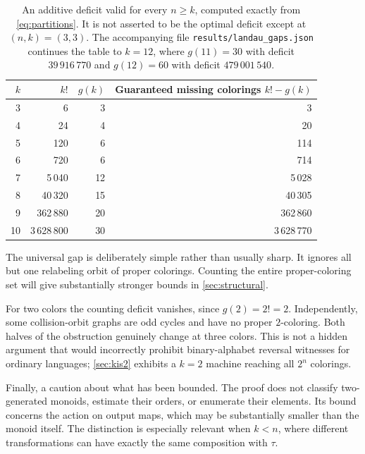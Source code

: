\documentclass[11pt,a4paper]{article}
\numberwithin{equation}{section}
\theoremstyle{definition}
\theoremstyle{remark}
\begin{document}
\begin{table}[htbp]
\centering
\begin{tabular}{@{}rrrr@{}}
\toprule
$k$ & $k!$ & $g(k)$ & Guaranteed missing colorings $k!-g(k)$\\
\midrule
3 & 6 & 3 & 3\\
4 & 24 & 4 & 20\\
5 & 120 & 6 & 114\\
6 & 720 & 6 & 714\\
7 & 5\,040 & 12 & 5\,028\\
8 & 40\,320 & 15 & 40\,305\\
9 & 362\,880 & 20 & 362\,860\\
10 & 3\,628\,800 & 30 & 3\,628\,770\\
\bottomrule
\end{tabular}
\caption{An additive deficit valid for every $n\ge k$, computed exactly from
\eqref{eq:partitions}. It is not asserted to be the optimal deficit except
at $(n,k)=(3,3)$. The accompanying file
\texttt{results/landau\_gaps.json} continues the table to $k=12$, where
$g(11)=30$ with deficit $39\,916\,770$ and $g(12)=60$ with deficit
$479\,001\,540$.}
\label{tab:landau}
\end{table}

The universal gap is deliberately simple rather than usually sharp. It
ignores all but one relabeling orbit of proper colorings. Counting the entire
proper-coloring set will give substantially stronger bounds in
\cref{sec:structural}.

\begin{remark}\label{rem:whythree}
For two colors the counting deficit vanishes, since $g(2)=2!=2$. Independently,
some collision-orbit graphs are odd cycles and have no proper $2$-coloring.
Both halves of the obstruction genuinely change at three colors. This is not
a hidden argument that would incorrectly prohibit binary-alphabet reversal
witnesses for ordinary languages; \cref{sec:kis2} exhibits a $k=2$ machine
reaching all $2^n$ colorings.
\end{remark}

Finally, a caution about what has been bounded. The proof does not classify
two-generated monoids, estimate their orders, or enumerate their elements.
Its bound concerns the action on output maps, which may be substantially
smaller than the monoid itself. The distinction is especially relevant when
$k<n$, where different transformations can have exactly the same composition
with $\tau$.
\end{document}
